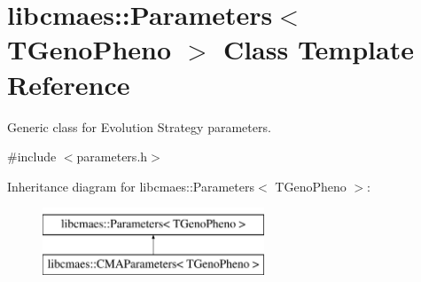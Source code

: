 \hypertarget{classlibcmaes_1_1Parameters}{\section{libcmaes\-:\-:Parameters$<$ T\-Geno\-Pheno $>$ Class Template Reference}
\label{classlibcmaes_1_1Parameters}
}


Generic class for Evolution Strategy parameters.  




{\ttfamily \#include $<$parameters.\-h$>$}

Inheritance diagram for libcmaes\-:\-:Parameters$<$ T\-Geno\-Pheno $>$\-:\begin{figure}[H]
\begin{center}
\leavevmode
\includegraphics[height=2.000000cm]{classlibcmaes_1_1Parameters}
\end{center}
\end{figure}
